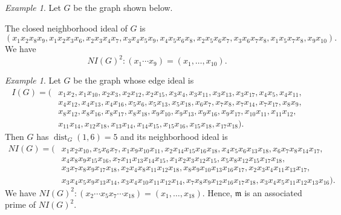 \documentclass[12pt,reqno,twoside]{amsart}
\newcommand{\mm}{\mathfrak m}
\DeclareMathOperator{\dist}{dist}
\theoremstyle{definition}
\theoremstyle{plain}
\theoremstyle{remark}
\newtheorem{exm}[thm]{Example}
\numberwithin{equation}{section}
\begin{document}
\begin{exm}
Let $G$ be the graph shown below. 
\begin{center}
\end{center}
The closed neighborhood ideal of $G$ is 
$$(x_1x_2x_8x_9,x_1x_2x_3x_6,x_2x_3x_4x_7,x_3x_4x_5x_9,x_4x_5x_6x_8,x_2x_5x_6x_7,x_3x_6x_7x_8,x_1x_5x_7x_8,x_9x_{10}).$$
We have 
$$NI(G)^2 : (x_1\cdots x_9) = (x_1,\ldots,x_{10}).$$    
\end{exm}

\begin{exm}
Let $G$ be the graph whose edge ideal is
\begin{align*}
    I(G) = (&x_1x_2,x_1x_{10},x_2x_3,x_2x_{12},x_2x_{15},x_3x_4,x_3x_{11},x_3x_{13},x_3x_{17},x_4x_5,x_4x_{11},\\
    &x_4x_{12},x_4x_{13},x_4x_{16},x_5x_6,x_5x_{13},x_5x_{18},x_6x_7,x_7x_8,x_7x_{14},x_7x_{17},x_8x_9,\\
    &x_8x_{12},x_8x_{16},x_8x_{17},x_8x_{18},x_9x_{10},x_9x_{13},x_9x_{16},x_9x_{17},x_{10}x_{11},x_{11}x_{12},\\
    &x_{11}x_{14},x_{12}x_{18},x_{13}x_{14},x_{14}x_{15},x_{15}x_{16},x_{15}x_{18},x_{17}x_{18}).
\end{align*}
Then $G$ has $\dist_G(1,6) = 5$ and its neighborhood ideal is 
\begin{align*}
    NI(G) = (&x_1x_2x_{10},x_5x_6x_7,x_1x_9x_{10}x_{11},x_2x_{14}x_{15}x_{16}x_{18},x_4x_{5}x_6x_{13}x_{18},x_6x_7x_8x_{14}x_{17},\\
    &x_4x_8x_{9}x_{15}x_{16},x_7x_{11}x_{13}x_{14}x_{15},x_1x_2x_3x_{12}x_{15},x_5x_8x_{12}x_{15}x_{17}x_{18},\\
    &x_3x_{7}x_8x_9x_{17}x_{18},x_2x_{4}x_8x_{11}x_{12}x_{18},x_8x_9x_{10}x_{13}x_{16}x_{17},x_{2}x_{3}x_4x_{11}x_{13}x_{17},\\
    &x_{3}x_{4}x_{5}x_{9}x_{13}x_{14},x_{3}x_{4}x_{10}x_{11}x_{12}x_{14},x_{7}x_{8}x_{9}x_{12}x_{16}x_{17}x_{18},x_3x_4x_5x_{11}x_{12}x_{13}x_{16}).
\end{align*}
We have $NI(G)^2 : (x_2\cdots x_5 x_7 \cdots x_{18}) = (x_1,\ldots,x_{18})$. Hence, $\mm$ is an associated prime of $NI(G)^2$.
\end{exm}
\end{document}
